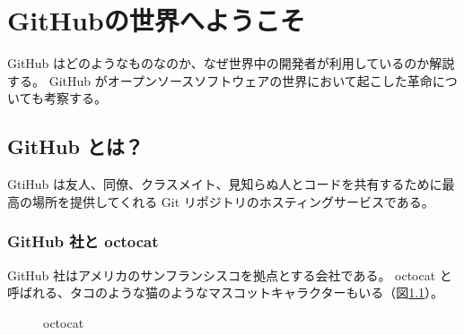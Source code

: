 \chapter{GitHubの世界へようこそ}
GitHub はどのようなものなのか、なぜ世界中の開発者が利用しているのか解説する。
GitHub がオープンソースソフトウェアの世界において起こした革命についても考察する。
\section{GitHub とは？}
GtiHub は友人、同僚、クラスメイト、見知らぬ人とコードを共有するために最高の場所を提供してくれる Git リポジトリのホスティングサービスである。
\subsection{GitHub 社と octocat}
GitHub 社はアメリカのサンフランシスコを拠点とする会社である。
octocat と呼ばれる、タコのような猫のようなマスコットキャラクターもいる（図\ref{octocat}）。
\begin{figure}[H]\centering{}\caption{octocat}\label{octocat}\end{figure}

